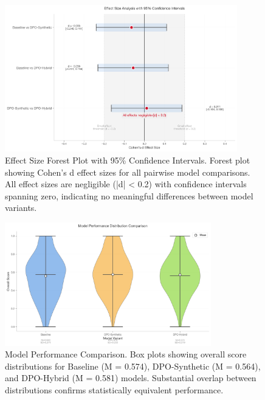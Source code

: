 
\begin{figure}[htbp]
    \centering
    \includegraphics[width=0.9\textwidth]{figures/effect_size_forest_plot.png}
    \caption{Effect Size Forest Plot with 95\% Confidence Intervals. Forest plot showing Cohen's d effect sizes for all pairwise model comparisons. All effect sizes are negligible (|d| < 0.2) with confidence intervals spanning zero, indicating no meaningful differences between model variants.}
    \label{fig:effect-size-forest}
\end{figure}

\begin{figure}[htbp]
    \centering
    \includegraphics[width=0.8\textwidth]{figures/model_comparison_boxplot.png}
    \caption{Model Performance Comparison. Box plots showing overall score distributions for Baseline (M = 0.574), DPO-Synthetic (M = 0.564), and DPO-Hybrid (M = 0.581) models. Substantial overlap between distributions confirms statistically equivalent performance.}
    \label{fig:model-comparison}
\end{figure}

